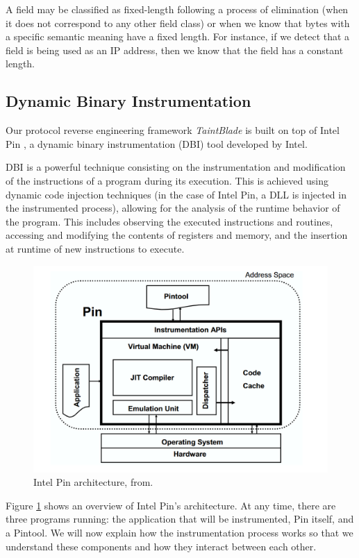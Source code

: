 \documentclass[conference]{IEEEtran}
\begin{document}
A field may be classified as fixed-length following a process of elimination
(when it does not correspond to any other field class) or when we know that
bytes with a specific semantic meaning have a fixed length. For instance, if we
detect that a field is being used as an IP address, then we know that the field
has a constant length.

\subsection {Dynamic Binary Instrumentation}
Our protocol reverse engineering framework \textit{TaintBlade} is built on top
of Intel Pin \cite{intelpin_main}, a dynamic binary instrumentation (DBI) tool
developed by Intel.

DBI is a powerful technique consisting on the instrumentation and modification
of the instructions of a program during its execution. This is achieved using
dynamic code injection techniques (in the case of Intel Pin, a DLL is injected
in the instrumented process), allowing for the analysis of the runtime behavior
of the program. This includes observing the executed instructions and routines,
accessing and modifying the contents of registers and memory, and the insertion
at runtime of new instructions to execute.

\begin{figure}[htbp]
    \centerline{\includegraphics[width=1.0\columnwidth]{images/intelpin_arch.png}}
    \caption{Intel Pin architecture, from\cite{intelpin_lukpaper}.}
    \label{figure:intelpin_arch}
\end{figure}

Figure \ref{figure:intelpin_arch} shows an overview of Intel Pin's
architecture. At any time, there are three programs running: the application
that will be instrumented, Pin itself, and a Pintool. We will now explain how
the instrumentation process works so that we understand these components and
how they interact between each other.
\end{document}
